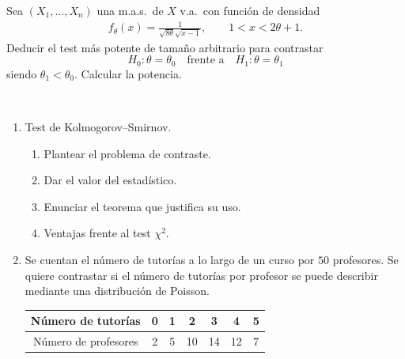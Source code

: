 \documentclass[12pt]{article}
\begin{document}
    \begin{ejercicio}
        Sea $(X_1,\dots,X_n)$ una m.a.s.\ de $X$ v.a.\ con función de densidad
        \begin{gather}
            f_\theta(x)=\frac{1}{\sqrt{8\theta}\sqrt{x-1}}, \qquad 1<x<2\theta+1.
        \end{gather}
        Deducir el test más potente de tamaño arbitrario para contrastar
        $$H_0:\theta=\theta_0 \quad \text{frente a} \quad H_1:\theta=\theta_1$$
        siendo $\theta_1<\theta_0$. Calcular la potencia.
    \end{ejercicio}

    \begin{ejercicio}~
        \begin{enumerate}
            \item[a)] Test de Kolmogorov--Smirnov.
            \begin{enumerate}
                \item[i)] Plantear el problema de contraste.
                \item[ii)] Dar el valor del estadístico.
                \item[iii)] Enunciar el teorema que justifica su uso.
                \item[iv)] Ventajas frente al test $\chi^2$.
            \end{enumerate}
            \item[b)] Se cuentan el número de tutorías a lo largo de un curso por $50$ profesores.
            Se quiere contrastar si el número de tutorías por profesor se puede describir
            mediante una distribución de Poisson.

            \begin{center}
                \begin{tabular}{c|cccccc}
                    Número de tutorías & 0 & 1 & 2 & 3 & 4 & 5 \\ \hline
                    Número de profesores & 2 & 5 & 10 & 14 & 12 & 7
                \end{tabular}
            \end{center}
        \end{enumerate}
    \end{ejercicio}

    \newpage

    \setcounter{ejercicio}{0}
\end{document}
